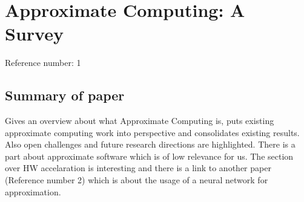 \section*{Approximate Computing: A Survey}
Reference number: 1

\subsection*{Summary of paper}
Gives an overview about what Approximate Computing is, puts existing approximate computing work into perspective and consolidates existing results. Also open challenges and future research directions are highlighted. There is a part about approximate software which is of low relevance for us. The section over HW accelaration is interesting and there is a link to another paper (Reference number 2) which is about the usage of a neural network for approximation.

